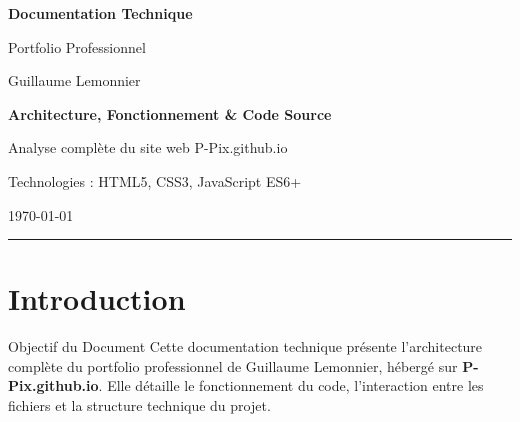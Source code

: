 \documentclass[12pt,a4paper]{article}
\begin{document}
\begin{titlepage}
    \centering
    \vspace*{2cm}
    
    {\Huge\bfseries\color{bluecolor} Documentation Technique}
    
    \vspace{1cm}
    
    {\LARGE\color{redcolor} Portfolio Professionnel}
    
    \vspace{0.5cm}
    
    {\Large\color{greencolor} Guillaume Lemonnier}
    
    \vspace{2cm}
    
    \begin{tcolorbox}[colback=yellow!10, colframe=yellowcolor, width=0.8\textwidth]
        \centering
        \textbf{\Large Architecture, Fonctionnement \& Code Source}
        
        \vspace{0.5cm}
        
        Analyse complète du site web P-Pix.github.io
        
        Technologies : HTML5, CSS3, JavaScript ES6+
    \end{tcolorbox}
    
    \vspace{2cm}
    
    {\large\color{darkgray} \today}
    
    \vfill
    
    {\color{bluecolor} \rule{\textwidth}{2pt}}
\end{titlepage}

\tableofcontents
\newpage

\section{Introduction}

\begin{redbox}{Objectif du Document}
Cette documentation technique présente l'architecture complète du portfolio professionnel de Guillaume Lemonnier, hébergé sur \textbf{P-Pix.github.io}. Elle détaille le fonctionnement du code, l'interaction entre les fichiers et la structure technique du projet.
\end{redbox}
\end{document}

